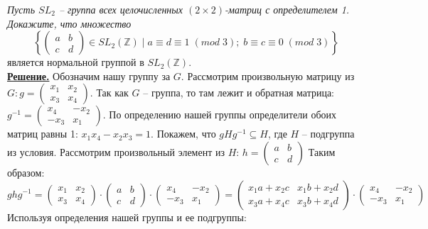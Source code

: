 \documentclass[14pt,a4paper]{scrartcl}
\begin{document}
\begin{spacing}{1}
	
\begin{center}
\end{center}
	\textit{Пусть $SL_2$ -- группа всех целочисленных $(2\times 2)$-матриц с определителем 1. Докажите, что множество
		$$
		\left\{\begin{pmatrix}
		a & b\\
		c & d
		\end{pmatrix} \in SL_2(\mathbb{Z})\;|\;a \equiv d \equiv 1\; (mod\; 3);\;	b \equiv c \equiv 0\;(mod\;3)\right\}
		$$}
	является нормальной группой в $SL_2(\mathbb{Z})$.\\
	\noindent \textbf{\underline{Решение.}} Обозначим нашу группу за $G$. Рассмотрим произвольную матрицу из $G :g =  \begin{pmatrix}
	x_1 & x_2\\
	x_3 & x_4
	\end{pmatrix}$. Так как $G$ -- группа, то там лежит и обратная матрица: $g^{-1} = \begin{pmatrix}
	x_4 & -x_2\\
	-x_3 & x_1
	\end{pmatrix}$. По определению нашей группы определители обоих матриц равны 1: $x_1x_4 - x_2x_3 = 1$. Покажем, что $gHg^{-1} \subseteq H$, где $H$ -- подгруппа из условия. Рассмотрим произвольный элемент из $H$: $h = \begin{pmatrix}
		a & b \\
		c & d
	\end{pmatrix} $
	Таким образом:
	$$
	ghg^{-1} = \begin{pmatrix}
	x_1 & x_2\\
	x_3 & x_4
	\end{pmatrix} \cdot 
	\begin{pmatrix}
	a & b \\
	c & d
	\end{pmatrix} \cdot
	\begin{pmatrix}
	x_4 & -x_2\\
	-x_3 & x_1
	\end{pmatrix} = 
	\begin{pmatrix}
	x_1a+x_2c & x_1b+x_2d\\
	x_3a + x_4c & x_3b + x_4d
	\end{pmatrix}	\cdot
	\begin{pmatrix}
	x_4 & -x_2\\
	-x_3 & x_1
	\end{pmatrix}
	$$
	Используя определения нашей группы и ее подгруппы:
	\begin{enumerate}

\end{enumerate}
\end{spacing}
\end{document}
